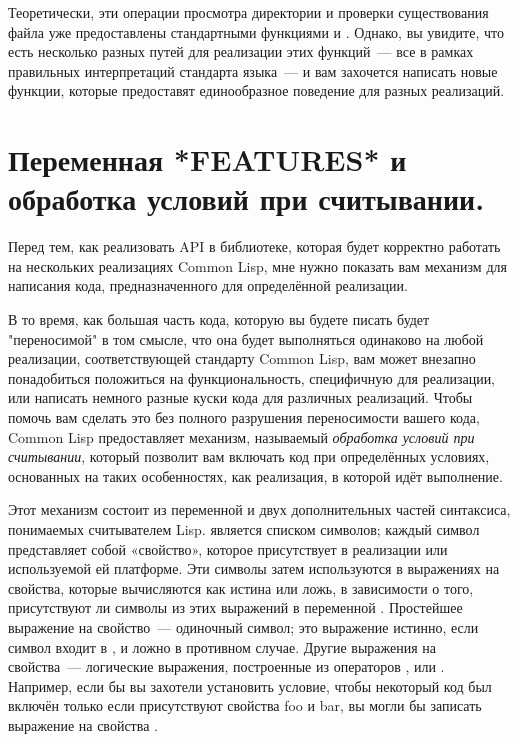 Теоретически, эти операции просмотра директории и проверки существования файла уже
предоставлены стандартными функциями  и . Однако, вы
увидите, что есть несколько разных путей для реализации этих функций~--- все в рамках
правильных интерпретаций стандарта языка~--- и вам захочется написать новые функции,
которые предоставят единообразное поведение для разных реализаций.

\section{Переменная *FEATURES* и обработка условий при считывании.}

Перед тем, как реализовать API в библиотеке, которая будет корректно работать на
нескольких реализациях Common Lisp, мне нужно показать вам механизм для написания кода,
предназначенного для определённой реализации.

В то время, как большая часть кода, которую вы будете писать будет "переносимой" в том
смысле, что она будет выполняться одинаково на любой реализации, соответствующей стандарту
Common Lisp, вам может внезапно понадобиться положиться на функциональность, специфичную
для реализации, или написать немного разные куски кода для различных реализаций. Чтобы
помочь вам сделать это без полного разрушения переносимости вашего кода, Common Lisp
предоставляет механизм, называемый \textit{обработка условий при считывании}, который
позволит вам включать код при определённых условиях, основанных на таких особенностях, как
реализация, в которой идёт выполнение.

Этот механизм состоит из переменной  и двух дополнительных частей
синтаксиса, понимаемых считывателем Lisp.  является списком символов;
каждый символ представляет собой «свойство», которое присутствует в реализации или
используемой ей платформе. Эти символы затем используются в выражениях на свойства,
которые вычисляются как истина или ложь, в зависимости о того, присутствуют ли символы из
этих выражений в переменной . Простейшее выражение на свойство~---
одиночный символ; это выражение истинно, если символ входит в , и ложно в
противном случае. Другие выражения на свойства~--- логические выражения, построенные из
операторов ,  или . Например, если бы вы захотели установить
условие, чтобы некоторый код был включён только если присутствуют свойства foo и bar, вы
могли бы записать выражение на свойства .

